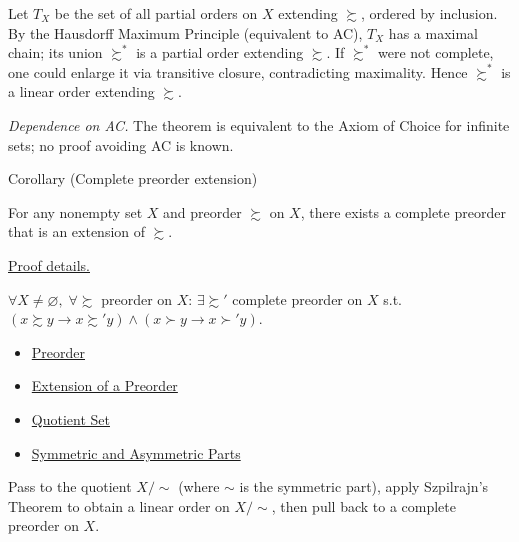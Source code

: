 \begin{remark*}
Let $T_X$ be the set of all partial orders on $X$ extending $\succsim$,
ordered by inclusion. By the Hausdorff Maximum Principle (equivalent to
AC), $T_X$ has a maximal chain; its union $\succsim^*$ is a partial order
extending $\succsim$. If $\succsim^*$ were not complete, one could enlarge
it via transitive closure, contradicting maximality. Hence $\succsim^*$ is a
linear order extending $\succsim$.

\medskip
\noindent\textit{Dependence on AC.} The theorem is equivalent to the Axiom
of Choice for infinite sets; no proof avoiding AC is known.
\end{remark*}

\begin{corollarybox}{Corollary (Complete preorder extension)}
\begin{corollary}
\label{cor:complete-preorder-extension}
For any nonempty set $X$ and preorder $\succsim$ on $X$, there exists a
complete preorder that is an extension of $\succsim$.
\end{corollary}
\end{corollarybox}

\begin{remark*}[Proof]
\hyperref[prf:complete-preorder-extension]{Proof details.}
\end{remark*}

\begin{remark*}
$\forall X \neq \varnothing,\; \forall \succsim$ preorder on $X$: $\exists \succsim'$ complete preorder on $X$ s.t.\ $(x \succsim y \to x \succsim' y) \wedge (x \succ y \to x \succ' y)$.
\end{remark*}

\begin{dependencies}
\begin{itemize}
  \item \hyperref[def:preorder]{Preorder}
  \item \hyperref[def:preorder-extension]{Extension of a Preorder}
  \item \hyperref[def:quotient-set]{Quotient Set}
  \item \hyperref[def:sym-asym]{Symmetric and Asymmetric Parts}
\end{itemize}
\end{dependencies}

\begin{remark*}[Proof]
Pass to the quotient $X/{\sim}$ (where $\sim$ is the symmetric part), apply
Szpilrajn's Theorem to obtain a linear order on $X/{\sim}$, then pull back
to a complete preorder on $X$.
\end{remark*}


